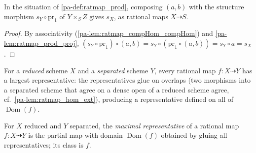 \begin{lemma}
  \label{pa-lem:ratmap_prod_over}
  \leanok

  In the situation of \ref{pa-def:ratmap_prod}, composing \((a,b)\) with the
  structure morphism \(s_Y \circ \mathrm{pr}_1\) of \(Y \times_S Z\) gives
  \(s_X\), as rational maps \(X \dashrightarrow S\).
\end{lemma}
\begin{proof}
  \leanok
  By associativity (\ref{pa-lem:ratmap_compHom_compHom}) and
  \ref{pa-lem:ratmap_prod_proj},
  \((s_Y \circ \mathrm{pr}_1) \circ (a,b) = s_Y \circ (\mathrm{pr}_1 \circ (a,b))
  = s_Y \circ a = s_X\).
\end{proof}

For a \emph{reduced} scheme \(X\) and a \emph{separated} scheme \(Y\), every
rational map \(f : X \dashrightarrow Y\) has a largest representative: the
representatives glue on overlaps (two morphisms into a separated scheme that
agree on a dense open of a reduced scheme agree, cf.\
\ref{pa-lem:ratmap_hom_ext}), producing a representative defined on all of
\(\operatorname{Dom}(f)\).

\begin{definition}
  \label{pa-def:ratmap_toPartialMap}
  \mathlibok
  \leanok

  For \(X\) reduced and \(Y\) separated, the \emph{maximal representative} of a
  rational map \(f : X \dashrightarrow Y\) is the partial map with domain
  \(\operatorname{Dom}(f)\) obtained by gluing all representatives; its class
  is \(f\).
\end{definition}

